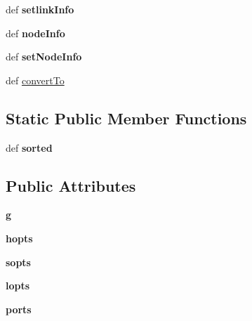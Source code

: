 \begin{DoxyCompactItemize}
\item 
\hypertarget{classmininet_1_1topo_1_1Topo_a0e4081c6546a423a8724a7ac61ef9525}{def {\bfseries setlink\-Info}}\label{classmininet_1_1topo_1_1Topo_a0e4081c6546a423a8724a7ac61ef9525}

\item 
\hypertarget{classmininet_1_1topo_1_1Topo_ae0a5d2f82528cea4bc6c9182e7be3a26}{def {\bfseries node\-Info}}\label{classmininet_1_1topo_1_1Topo_ae0a5d2f82528cea4bc6c9182e7be3a26}

\item 
\hypertarget{classmininet_1_1topo_1_1Topo_a50c251ee1ab591319040c11e437e151f}{def {\bfseries set\-Node\-Info}}\label{classmininet_1_1topo_1_1Topo_a50c251ee1ab591319040c11e437e151f}

\item 
def \hyperlink{classmininet_1_1topo_1_1Topo_aa26e0fa82e7ef2f76973bfbffa58111c}{convert\-To}
\end{DoxyCompactItemize}
\subsection*{Static Public Member Functions}
\begin{DoxyCompactItemize}
\item 
\hypertarget{classmininet_1_1topo_1_1Topo_a916097bac0c027b93e20ef7b2f3411bb}{def {\bfseries sorted}}\label{classmininet_1_1topo_1_1Topo_a916097bac0c027b93e20ef7b2f3411bb}

\end{DoxyCompactItemize}
\subsection*{Public Attributes}
\begin{DoxyCompactItemize}
\item 
\hypertarget{classmininet_1_1topo_1_1Topo_a70bbf3eeb5ca78c00bed747550f200fb}{{\bfseries g}}\label{classmininet_1_1topo_1_1Topo_a70bbf3eeb5ca78c00bed747550f200fb}

\item 
\hypertarget{classmininet_1_1topo_1_1Topo_a00bfbf1a906cee8ffedb1b580be4cc9e}{{\bfseries hopts}}\label{classmininet_1_1topo_1_1Topo_a00bfbf1a906cee8ffedb1b580be4cc9e}

\item 
\hypertarget{classmininet_1_1topo_1_1Topo_a024d34f258d27a1ea25fba80f51e2336}{{\bfseries sopts}}\label{classmininet_1_1topo_1_1Topo_a024d34f258d27a1ea25fba80f51e2336}

\item 
\hypertarget{classmininet_1_1topo_1_1Topo_afd3106f9f94f83c5b18cc7bd5c5881c8}{{\bfseries lopts}}\label{classmininet_1_1topo_1_1Topo_afd3106f9f94f83c5b18cc7bd5c5881c8}

\item 
\hypertarget{classmininet_1_1topo_1_1Topo_a5601b1d8b5d657cc7d47342d6c09787f}{{\bfseries ports}}\label{classmininet_1_1topo_1_1Topo_a5601b1d8b5d657cc7d47342d6c09787f}

\end{DoxyCompactItemize}


